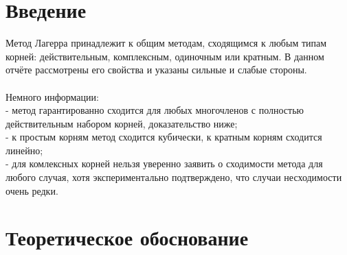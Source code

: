 \documentclass[a4paper,12pt]{article}
\begin{document}
\tableofcontents
\hyperpage{}

\newpage
\section{Введение} 
Метод Лагерра принадлежит к общим методам, сходящимся к любым типам корней: действительным, комплексным, одиночным или кратным. В данном отчёте рассмотрены его свойства и указаны сильные и слабые стороны.
\\\\
Немного информации: \\
- метод гарантированно сходится для любых многочленов с полностью действительным набором корней, доказательство ниже; \\
- к простым корням метод сходится кубически, к кратным корням сходится линейно; \\
- для комлексных корней нельзя уверенно заявить о сходимости метода для любого случая, хотя экспериментально подтверждено, что случаи несходимости очень редки.
\newpage
\section{Теоретическое обоснование}
\end{document}
